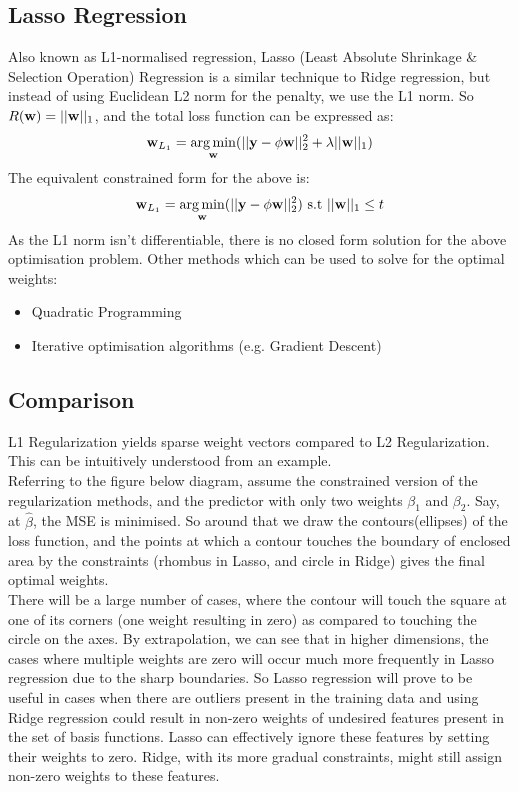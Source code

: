 \subsection{Lasso Regression}

Also known as L1-normalised regression, Lasso (Least Absolute Shrinkage \& Selection Operation) Regression is a similar technique to Ridge regression, but instead of using Euclidean L2 norm for the penalty, we use the L1 norm. So $R(\mathbf{w}) = ||\mathbf{w}||_1$, and the total loss function can be expressed as:
\begin{equation*}
  \mathbf{w}_{L_1} = \operatorname*{arg\,min}_{\mathbf{w}} (||\mathbf{y}-\phi \mathbf{w}||_2^2 + \lambda||\mathbf{w}||_1)
\end{equation*}
The equivalent constrained form for the above is:
\begin{equation*}
  \mathbf{w}_{L_1} = \operatorname*{arg\,min}_{\mathbf{w}} (||\mathbf{y}-\phi \mathbf{w}||_2^2) \text{ s.t } ||\mathbf{w}||_1 \leq t
\end{equation*}
As the L1 norm isn't differentiable, there is no closed form solution for the above optimisation problem. Other methods which can be used to solve for the optimal weights:
\begin{itemize}
  \item Quadratic Programming
  \item Iterative optimisation algorithms (e.g. Gradient Descent)
\end{itemize}

\subsection{Comparison}

L1 Regularization yields sparse weight vectors compared to L2 Regularization. This can be intuitively understood from an example. \\

Referring to the figure below diagram, assume the constrained version of the regularization methods, and the predictor with only two weights $\beta_1$ and $\beta_2$. Say, at $\hat{\beta}$, the MSE is minimised. So around that we draw the contours(ellipses) of the loss function, and the points at which a contour touches the boundary of enclosed area by the constraints (rhombus in Lasso, and circle in Ridge) gives the final optimal weights.\\

There will be a large number of cases, where the contour will touch the square at one of its corners (one weight resulting in zero) as compared to touching the circle on the axes. By extrapolation, we can see that in higher dimensions, the cases where multiple weights are zero will occur much more frequently in Lasso regression due to the sharp boundaries. So Lasso regression will prove to be useful in cases when there are outliers present in the training data and using Ridge regression could result in non-zero weights of undesired features present in the set of basis functions. Lasso can effectively ignore these features by setting their weights to zero. Ridge, with its more gradual constraints, might still assign non-zero weights to these features. \\

